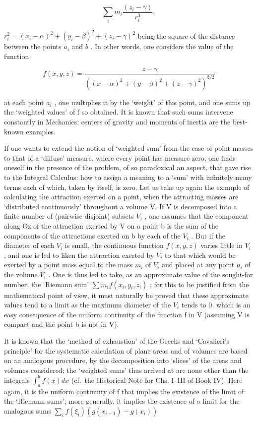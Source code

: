 \[
\sum_ {i} m _ {i} \frac {(z _ {i} - \gamma)}{r _ {i} ^ {3}},
\]

\(r_i^2 = (x_i - \alpha)^2 + (y_i - \beta)^2 + (z_i - \gamma)^2\) being the square of the distance between the points \(a_i\) and \(b\) . In other words, one considers the value of the function

\[
f (x, y, z) = \frac {z - \gamma}{\left((x - \alpha) ^ {2} + (y - \beta) ^ {2} + (z - \gamma) ^ {2}\right) ^ {3 / 2}}
\]

at each point \(a_{i}\) , one multiplies it by the `weight' of this point, and one sums up the `weighted values' of f so obtained. It is known that such sums intervene constantly in Mechanics: centers of gravity and moments of inertia are the best-known examples.

If one wants to extend the notion of `weighted sum' from the case of point masses to that of a `diffuse' measure, where every point has measure zero, one finds oneself in the presence of the problem, of so paradoxical an aspect, that gave rise to the Integral Calculus: how to assign a meaning to a `sum' with infinitely many terms each of which, taken by itself, is zero. Let us take up again the example of calculating the attraction exerted on a point, when the attracting masses are `distributed continuously' throughout a volume V. If V is decomposed into a finite number of (pairwise disjoint) subsets \(V_{i}\) , one assumes that the component along Oz of the attraction exerted by V on a point b is the sum of the components of the attractions exerted on b by each of the \(V_{i}\) . But if the diameter of each \(V_{i}\) is small, the continuous function \(f(x,y,z)\) varies little in \(V_{i}\) , and one is led to liken the attraction exerted by \(V_{i}\) to that which would be exerted by a point mass equal to the mass \(m_{i}\) of \(V_{i}\) and placed at any point \(a_{i}\) of the volume \(V_{i}\) . One is thus led to take, as an approximate value of the sought-for number, the `Riemann sum' \(\sum m_{i}f(x_{i},y_{i},z_{i})\) ; for this to be justified from the mathematical point of view, it must naturally be proved that these approximate values tend to a limit as the maximum diameter of the \(V_{i}\) tends to 0, which is an easy consequence of the uniform continuity of the function f in V (assuming V is compact and the point b is not in V).

It is known that the `method of exhaustion' of the Greeks and `Cavalieri's principle' for the systematic calculation of plane areas and of volumes are based on an analogous procedure, by the decomposition into `slices' of the areas and volumes considered; the `weighted sums' thus arrived at are none other than the integrals \(\int_{a}^{b} f(x) dx\) (cf.~the Historical Note for Chs. I--III of Book IV). Here again, it is the uniform continuity of f that implies the existence of the limit of the `Riemann sums'; more generally, it implies the existence of a limit for the analogous sums \(\sum_{i} f(\xi_{i})(g(x_{i+1}) - g(x_{i}))\)

